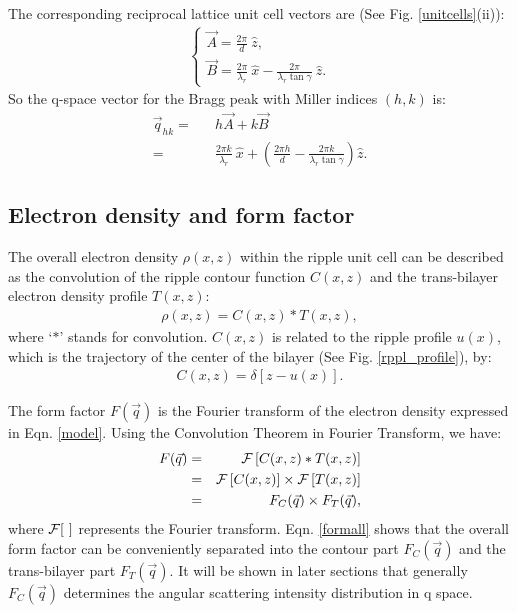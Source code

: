 The corresponding reciprocal lattice unit cell vectors are 
(See Fig. \ref{unitcells}(ii)):
\begin{eqnarray}
\label{reciunit}
\left\{ \begin{array}{ll}
\vec{A} = \frac{2 \pi}{d}\ \hat{z},\\
\vec{B} = \frac{2 \pi}{\lambda_r}\ \hat{x} - \frac{2 \pi}{\lambda_r 
\tan \gamma}\ \hat{z}.
\end{array}
\right.
\end{eqnarray}
So the q-space vector for the Bragg peak with Miller indices $(h,k)$
is:
\begin{eqnarray}
\label{qvector}
\vec{q}_{hk} =&& h \vec{A} + k \vec{B} \nonumber\\
=&& \frac{2 \pi k}{\lambda_r}\ \hat{x} + \left( \frac{2 \pi h}{d} -
\frac{2 \pi k}{\lambda_r \tan \gamma} \right) \hat{z}.
\end{eqnarray}

\subsection{Electron density and form factor}
\label{rppl_theory_2}

The overall electron density $\rho (x,z)$ within the ripple unit cell 
can be described as the convolution of the ripple contour function $C(x,z)$ 
and the trans-bilayer electron density profile $T(x,z)$:
\begin{eqnarray}
\label{model}
\rho (x,z) = C(x,z) \ast T(x,z),
\end{eqnarray}
where `$\ast$' stands for convolution. $C(x,z)$ is related to the ripple 
profile $u(x)$, which is the trajectory of the center of the bilayer (See
Fig. \ref{rppl_profile}), by:
\begin{eqnarray}
\label{contour}
C(x,z) = \delta [z - u(x)].
\end{eqnarray}

The form factor $F(\vec{q})$ is the Fourier transform of the electron density
expressed in Eqn. \ref{model}. Using the Convolution Theorem in Fourier
Transform, we have:
\begin{eqnarray}
\label{formall}
F(\vec{q}) =&& {\cal F} \left[ C(x,z) * T(x,z) \right]\nonumber\\
=&& {\cal F} \left[ C(x,z) \right] \times {\cal F} \left[ T(x,z) \right]\nonumber\\
=&& F_C(\vec{q}) \times F_T(\vec{q}),
\end{eqnarray}
where ${\cal F} [\ ]$ represents the Fourier transform. Eqn. \ref{formall}
shows that the overall form factor can be conveniently separated into
the contour part $F_C(\vec{q})$ and the trans-bilayer part $F_T(\vec{q})$. 
It will be shown in later sections that generally $F_C(\vec{q})$ determines
the angular scattering intensity distribution in q space.

